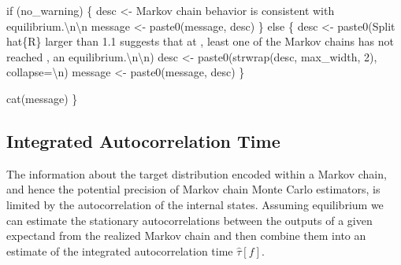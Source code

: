\documentclass[
  letterpaper,
  DIV=11,
  numbers=noendperiod]{scrartcl}
\newenvironment{Shaded}{\begin{snugshade}}{\end{snugshade}}
\newcommand{\CharTok}[1]{\textcolor[rgb]{0.13,0.47,0.30}{#1}}
\newcommand{\ControlFlowTok}[1]{\textcolor[rgb]{0.00,0.23,0.31}{#1}}
\newcommand{\DecValTok}[1]{\textcolor[rgb]{0.68,0.00,0.00}{#1}}
\newcommand{\NormalTok}[1]{\textcolor[rgb]{0.00,0.23,0.31}{#1}}
\newcommand{\OperatorTok}[1]{\textcolor[rgb]{0.37,0.37,0.37}{#1}}
\newcommand{\SpecialCharTok}[1]{\textcolor[rgb]{0.37,0.37,0.37}{#1}}
\newcommand{\StringTok}[1]{\textcolor[rgb]{0.13,0.47,0.30}{#1}}
\begin{document}
\begin{Shaded}
\begin{Highlighting}[]
  \ControlFlowTok{if}\NormalTok{ (no\_warning) \{}
\NormalTok{    desc }\OperatorTok{\textless{}{-}} \StringTok{\textquotesingle{}Markov chain behavior is consistent with equilibrium.}\CharTok{\textbackslash{}n\textbackslash{}n}\StringTok{\textquotesingle{}}
\NormalTok{    message }\OperatorTok{\textless{}{-}}\NormalTok{ paste0(message, desc)}
\NormalTok{  \} }\ControlFlowTok{else}\NormalTok{ \{}
\NormalTok{    desc }\OperatorTok{\textless{}{-}}\NormalTok{ paste0(}\StringTok{\textquotesingle{}Split hat}\SpecialCharTok{\{R\}}\StringTok{ larger than 1.1 suggests that at \textquotesingle{}}\NormalTok{,}
                   \StringTok{\textquotesingle{}least one of the Markov chains has not reached \textquotesingle{}}\NormalTok{,}
                   \StringTok{\textquotesingle{}an equilibrium.}\CharTok{\textbackslash{}n\textbackslash{}n}\StringTok{\textquotesingle{}}\NormalTok{)}
\NormalTok{    desc }\OperatorTok{\textless{}{-}}\NormalTok{ paste0(strwrap(desc, max\_width, }\DecValTok{2}\NormalTok{), collapse}\OperatorTok{=}\StringTok{\textquotesingle{}}\CharTok{\textbackslash{}n}\StringTok{\textquotesingle{}}\NormalTok{)}
\NormalTok{    message }\OperatorTok{\textless{}{-}}\NormalTok{ paste0(message, desc)}
\NormalTok{  \}}
  
\NormalTok{  cat(message)}
\NormalTok{\}}
\end{Highlighting}
\end{Shaded}

\subsection{Integrated Autocorrelation
Time}\label{integrated-autocorrelation-time}

The information about the target distribution encoded within a Markov
chain, and hence the potential precision of Markov chain Monte Carlo
estimators, is limited by the autocorrelation of the internal states.
Assuming equilibrium we can estimate the stationary autocorrelations
between the outputs of a given expectand from the realized Markov chain
and then combine them into an estimate of the integrated autocorrelation
time \(\hat{\tau}[f]\).
\end{document}
